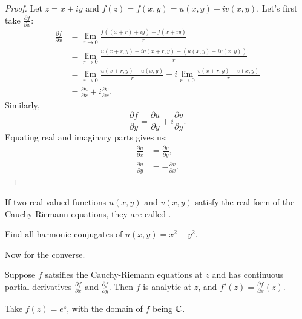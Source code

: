 \begin{proof}
    Let $z = x + iy$ and $f(z) = f(x,y) = u(x,y) + iv(x,y)$.
    Let's first take $\frac{\partial f}{\partial x}$:
    \begin{align*}
        \frac{\partial f}{\partial x} &= \lim_{r \to 0} \frac{f( (x+r) + iy) - f(x+iy)}{r} \\
        &= \lim_{r \to 0} \frac{u(x+r,y) + iv(x+r,y) - (u(x,y) + iv(x,y))}{r} \\
        &= \lim_{r \to 0} \frac{u(x+r,y) - u(x,y)}{r} + i\lim_{r \to 0} \frac{v(x+r,y) - v(x,y)}{r} \\
        &= \frac{\partial u}{\partial x} + i \frac{\partial v}{\partial x}.
    \end{align*}
    Similarly,
    \[ \frac{\partial f}{\partial y} = \frac{\partial u}{\partial y} + i\frac{\partial v}{\partial y}. \]
    Equating real and imaginary parts gives us:
    \begin{align*}
        \frac{\partial u}{\partial x} &= \frac{\partial v}{\partial y}, \\
        \frac{\partial u}{\partial y} &= -\frac{\partial v}{\partial x}.
    \end{align*}

\end{proof}
\noindent
If two real valued functions $u(x,y)$ and $v(x,y)$ satisfy the real form of the Cauchy-Riemann equations, they are called .

\begin{exercise}
    Find all harmonic conjugates of $u(x,y) = x^2 - y^2$.
\end{exercise}

\noindent
Now for the converse.
\begin{theorem}
    Suppose $f$ satsifies the Cauchy-Riemann equations at $z$ and has continuous partial derivatives $\frac{\partial f}{\partial x}$ and $\frac{\partial f}{\partial y}$.  Then $f$ is analytic at $z$, and $f'(z) = \frac{\partial f}{\partial x}(z)$.
\end{theorem}

\begin{example}
    Take $f(z) = e^z$, with the domain of $f$ being $\operatorname{\mathbb{C}}$.
\end{example}

